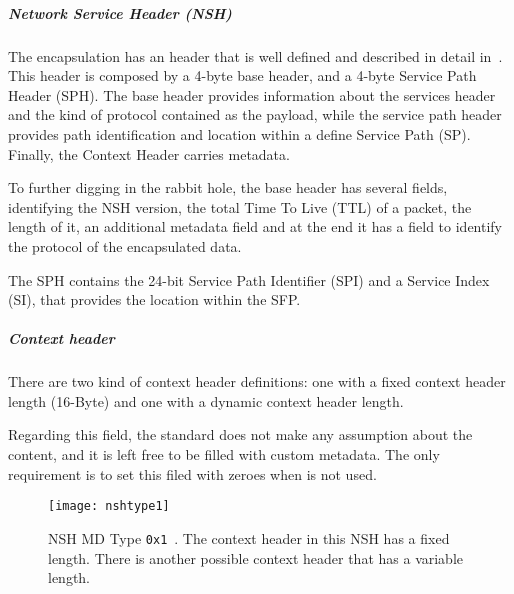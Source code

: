 \subparagraph*{Network Service Header (NSH)}
The encapsulation has an header that is well defined and described in detail
in~\cite{rfc8300}. This header is composed by a 4-byte base header, and a 4-byte
Service Path Header (SPH). The base header provides information about the services
header and the kind of protocol contained as the payload, while the service path
header provides path identification and location within a define Service Path
(SP). Finally, the Context Header carries metadata.

To further digging in the rabbit hole, the base header has several fields,
identifying the NSH version, the total Time To Live (TTL) of a packet, the
length of it, an additional metadata field and at the end it has a field to
identify the protocol of the encapsulated data.

The SPH contains the 24-bit Service Path Identifier (SPI) and a Service Index
(SI), that provides the location within the SFP.

\subparagraph*{Context header}
There are two kind of context header definitions: one with a fixed context
header length (16-Byte) and one with a dynamic context header length.

\noindent Regarding this field, the standard does not make any assumption about
the content, and it is left free to be filled with custom metadata. The only
requirement is to set this filed with zeroes when is not used.

\begin{figure}[t]
  \centering
  \texttt{[image: nshtype1]}
  \caption[NSH MD Type \texttt{0x1}]{NSH MD Type \texttt{0x1}~\cite{rfc8300}.
    The context header in this NSH has a fixed length. There is another possible
    context header that has a variable length.}
  \label{chap:background:img:nshtype1}
\end{figure}

